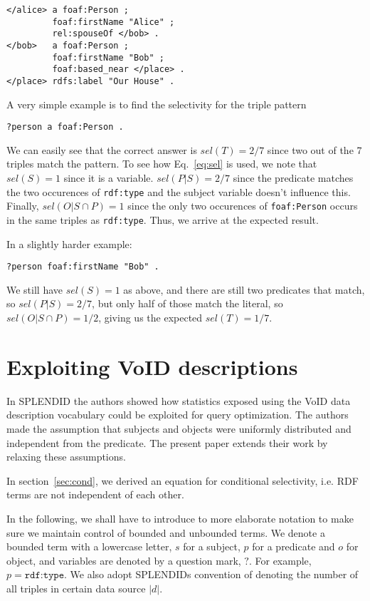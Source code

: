 \documentclass[12pt, draft]{article}
\newcommand{\rdfterm}[1]{\texttt{#1}}
\newcommand{\sel}[1]{\ensuremath{sel\left(#1\right)}}
\begin{document}
\begin{verbatim}
</alice> a foaf:Person ;
         foaf:firstName "Alice" ;
         rel:spouseOf </bob> .
</bob>   a foaf:Person ;
         foaf:firstName "Bob" ;
         foaf:based_near </place> .
</place> rdfs:label "Our House" .
\end{verbatim}

A very simple example is to find the selectivity for the triple pattern
\begin{verbatim}
?person a foaf:Person .
\end{verbatim}
We can easily see that the correct answer is $\sel{T} = 2/7$ since two
out of the 7 triples match the pattern. To see how Eq.~\ref{eq:sel} is
used, we note that $\sel{S} = 1$ since it is a variable. $\sel{P | S} =
2/7$ since the predicate matches the two occurences of
\rdfterm{rdf:type} and the subject variable doesn't influence
this. Finally, $\sel{O | S \cap P} = 1$ since the only two occurences
of \rdfterm{foaf:Person} occurs in the same triples as
\rdfterm{rdf:type}. Thus, we arrive at the expected result.

In a slightly harder example:
\begin{verbatim}
?person foaf:firstName "Bob" .
\end{verbatim}
We still have $\sel{S} = 1$ as above, and there are still two
predicates that match, so $\sel{P | S} = 2/7$, but only half of those
match the literal, so $\sel{O | S \cap P} = 1/2$, giving us the
expected $\sel{T} = 1/7$.

\section{Exploiting VoID descriptions}

In SPLENDID\cite{splendid} the authors showed how statistics exposed
using the VoID data description vocabulary\cite{void} could be
exploited for query optimization. The authors made the assumption that
subjects and objects were uniformly distributed and independent from
the predicate. The present paper extends their work by relaxing these
assumptions.

In section~\ref{sec:cond}, we derived an equation for conditional
selectivity, i.e. RDF terms are not independent of each
other.
 
In the following, we shall have to introduce to more elaborate
notation to make sure we maintain control of bounded and unbounded
terms. We denote a bounded term with a lowercase letter, $s$
for a subject, $p$ for a predicate and $o$ for object, and variables
are denoted by a question mark, $?$. For example, $p =
\rdfterm{rdf:type}$. We also adopt SPLENDIDs convention of denoting
the number of all triples in certain data source $|d|$.
\end{document}
